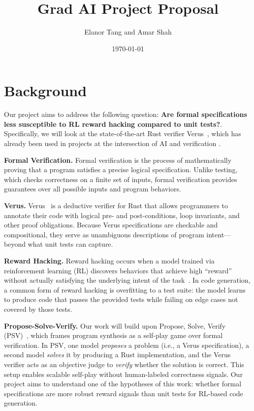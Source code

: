 \documentclass[11pt]{article}
\title{\textbf{Grad AI Project Proposal}}
\author{Elanor Tang and Amar Shah}
\date{\today}
\begin{document}
\maketitle

\section{Background}

Our project aims to address the following question: \textbf{Are formal
specifications less susceptible to RL reward hacking compared to unit tests?}.
Specifically, we will look at the state-of-the-art Rust verifier
Verus~\cite{Verus}, which has already been used in projects at the intersection
of AI and verification \cite{AutoVerus,alphaverus,verussage,RAGVerus,vericode}. 

\textbf{Formal Verification.}
Formal verification is the process of mathematically proving that a program satisfies a precise logical specification.
Unlike testing, which checks correctness on a finite set of inputs, formal verification provides guarantees over all possible inputs and program behaviors.

\textbf{Verus.}
Verus~\cite{Verus} is a deductive verifier for Rust that allows programmers to annotate their code with logical pre- and post-conditions, loop invariants, and other proof obligations.
Because Verus specifications are checkable and compositional, they serve as unambiguous descriptions of program intent---beyond what unit tests can capture.

\textbf{Reward Hacking.}
Reward hacking occurs when a model trained via reinforcement learning (RL) discovers behaviors that achieve high ``reward'' without actually satisfying the underlying intent of the task~\cite{RewardHacking}.
In code generation, a common form of reward hacking is overfitting to a test suite: the model learns to produce code that passes the provided tests while failing on edge cases not covered by those tests.

\textbf{Propose-Solve-Verify.}
Our work will build upon Propose, Solve, Verify (PSV)~\cite{PSV}, which frames program synthesis as a self-play game over formal verification.
In PSV, one model \emph{proposes} a problem (i.e., a Verus specification), a second model \emph{solves} it by producing a Rust implementation, and the Verus verifier acts as an objective judge to \emph{verify} whether the solution is correct.
This setup enables scalable self-play without human-labeled correctness signals.
Our project aims to understand one of the hypotheses of this work: whether formal specifications are more robust reward signals than unit tests for RL-based code generation.
\end{document}
